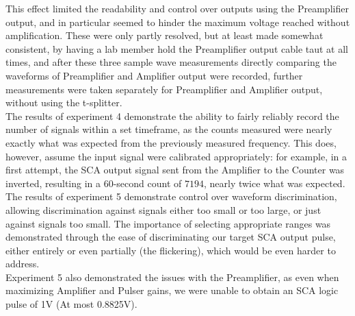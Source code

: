 \documentclass[12pt]{article}
\begin{document}
This effect limited the readability and control over outputs using the Preamplifier output, and in particular seemed to hinder the maximum voltage reached without amplification.
These were only partly resolved, but at least made somewhat consistent, by having a lab member hold the Preamplifier output cable taut at all times, and after these three sample wave measurements directly comparing the waveforms of Preamplifier and Amplifier output were recorded, further measurements were taken separately for Preamplifier and Amplifier output, without using the t-splitter.\\


The results of experiment 4 demonstrate the ability to fairly reliably record the number of signals within a set timeframe, as the counts measured were nearly exactly what was expected from the previously measured frequency.
This does, however, assume the input signal were calibrated appropriately: for example, in a first attempt, the SCA output signal sent from the Amplifier to the Counter was inverted, resulting in a 60-second count of $7194$, nearly twice what was expected.\\


The results of experiment 5 demonstrate control over waveform discrimination, allowing discrimination against signals either too small or too large, or just against signals too small.
The importance of selecting appropriate ranges was demonstrated through the ease of discriminating our target SCA output pulse, either entirely or even partially (the flickering), which would be even harder to address.\\

Experiment 5 also demonstrated the issues with the Preamplifier, as even when maximizing Amplifier and Pulser gains, we were unable to obtain an SCA logic pulse of 1V (At most 0.8825V).
\end{document}
